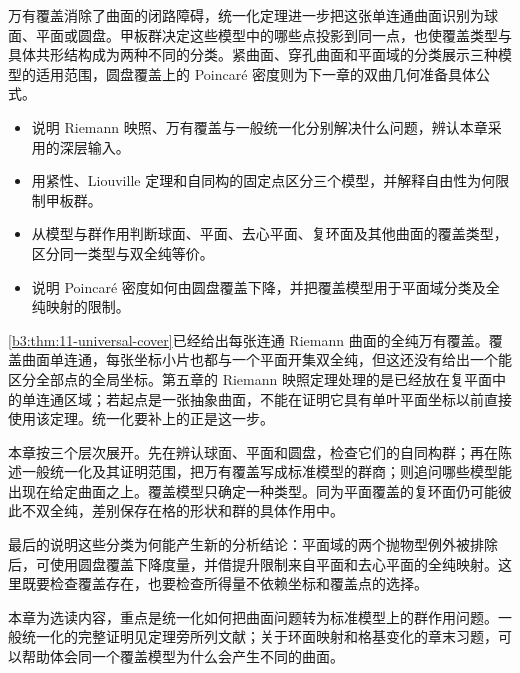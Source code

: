 \begin{chapterabstract}
万有覆盖消除了曲面的闭路障碍，统一化定理进一步把这张单连通曲面识别为球面、平面或圆盘。甲板群决定这些模型中的哪些点投影到同一点，也使覆盖类型与具体共形结构成为两种不同的分类。紧曲面、穿孔曲面和平面域的分类展示三种模型的适用范围，圆盘覆盖上的 Poincaré 密度则为下一章的双曲几何准备具体公式。
\end{chapterabstract}

\begin{learninggoals}
\begin{itemize}
\item\label{b3:item:12-goal-1}说明 Riemann 映照、万有覆盖与一般统一化分别解决什么问题，辨认本章采用的深层输入。
\item\label{b3:item:12-goal-2}用紧性、Liouville 定理和自同构的固定点区分三个模型，并解释自由性为何限制甲板群。
\item\label{b3:item:12-goal-3}从模型与群作用判断球面、平面、去心平面、复环面及其他曲面的覆盖类型，区分同一类型与双全纯等价。
\item\label{b3:item:12-goal-4}说明 Poincaré 密度如何由圆盘覆盖下降，并把覆盖模型用于平面域分类及全纯映射的限制。
\end{itemize}
\end{learninggoals}

\cref{b3:thm:11-universal-cover}已经给出每张连通 Riemann 曲面的全纯万有覆盖。覆盖曲面单连通，每张坐标小片也都与一个平面开集双全纯，但这还没有给出一个能区分全部点的全局坐标。第五章的 Riemann 映照定理处理的是已经放在复平面中的单连通区域；若起点是一张抽象曲面，不能在证明它具有单叶平面坐标以前直接使用该定理。统一化要补上的正是这一步。

\ProseParagraphBreak
本章按三个层次展开。先在辨认球面、平面和圆盘，检查它们的自同构群；再在陈述一般统一化及其证明范围，把万有覆盖写成标准模型的群商；则追问哪些模型能出现在给定曲面之上。覆盖模型只确定一种类型。同为平面覆盖的复环面仍可能彼此不双全纯，差别保存在格的形状和群的具体作用中。

\ProseParagraphBreak
最后的说明这些分类为何能产生新的分析结论：平面域的两个抛物型例外被排除后，可使用圆盘覆盖下降度量，并借提升限制来自平面和去心平面的全纯映射。这里既要检查覆盖存在，也要检查所得量不依赖坐标和覆盖点的选择。

\ProseParagraphBreak
本章为选读内容，重点是统一化如何把曲面问题转为标准模型上的群作用问题。一般统一化的完整证明见定理旁所列文献；关于环面映射和格基变化的章末习题，可以帮助体会同一个覆盖模型为什么会产生不同的曲面。

